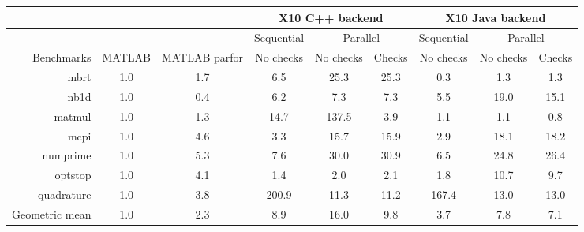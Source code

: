 \begin{tabular}{|r|c|c|c|cc|c|cc|}
\hline
               &        &               & \multicolumn{3}{c|}{X10 C++ backend}
& \multicolumn{3}{c|}{X10 Java backend}          \\ \hline
               &        &               & Sequential &
\multicolumn{2}{c|}{Parallel}     & Sequential & \multicolumn{2}{c|}{Parallel}
\\ \hline
Benchmarks     & MATLAB & MATLAB parfor &   No checks & No checks & 
Checks &     No checks       & No checks & Checks \\ \hline
mbrt           & 1.0    & 1.7           & 6.5                            & 25.3                         & 25.3                      & 0.3                             & 1.3                           & 1.3                        \\
nb1d           & 1.0    & 0.4           & 6.2                            & 7.3                          & 7.3                       & 5.5                             & 19.0                          & 15.1                       \\
matmul         & 1.0    & 1.3           & 14.7                           & 137.5                        & 3.9                       & 1.1                             & 1.1                           & 0.8                        \\
mcpi           & 1.0    & 4.6           & 3.3                            & 15.7                         & 15.9                      & 2.9                             & 18.1                          & 18.2                       \\
numprime       & 1.0    & 5.3           & 7.6                            & 30.0                         & 30.9                      & 6.5                             & 24.8                          & 26.4                       \\
optstop        & 1.0    & 4.1           & 1.4                            & 2.0                          & 2.1                       & 1.8                             & 10.7                          & 9.7                        \\
quadrature     & 1.0    & 3.8           & 200.9                          & 11.3                         & 11.2                      & 167.4                           & 13.0                          & 13.0                       \\ \hline
Geometric mean & 1.0    & 2.3           & 8.9                            & 16.0                         & 9.8                       & 3.7                             & 7.8                           & 7.1                        \\ \hline
\end{tabular}
